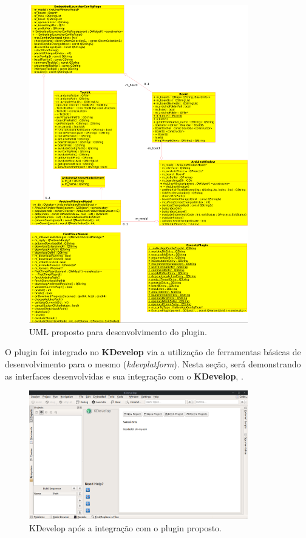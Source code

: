\begin{figure}[!htb]
  \centering
  \caption[UML proposto]{UML proposto para desenvolvimento do plugin.}
  \label{fig:uml}
  \includegraphics[width=0.85\textwidth]{figuras/uml.png}
\end{figure}


O plugin foi integrado no \textbf{KDevelop} via a utilização de ferramentas básicas de desenvolvimento para o mesmo (\textit{kdevplatform}). Nesta seção, será demonstrando as interfaces desenvolvidas e sua integração com o \textbf{KDevelop}, .

\begin{figure}[!htb]
  \centering
  \caption[KDevelop]{KDevelop após a integração com o plugin proposto.}
  \label{fig:kdevelop}
  \includegraphics[width=0.85\textwidth]{figuras/kdevelop.png}
\end{figure}

